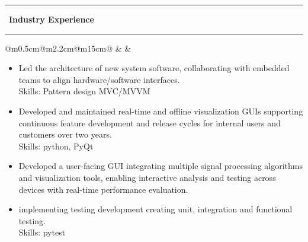 \documentclass[10pt,a4paper]{article}
\newcommand{\sectionline}[1]{%
  \vspace{0.5em}
  \begin{center}
    \textcolor{title_color}{\rule[0.5ex]{0.25\linewidth}{0.5pt}}
    ~{\LARGE \bfseries \textcolor{title_color}{\cambria #1}}~
    \textcolor{title_color}{\rule[0.5ex]{0.25\linewidth}{0.5pt}}
  \end{center}
  \vspace{0.05em}
}
\begin{document}
                      
\newpage
\sectionline{Industry Experience}                    
{\hspace{1.5em}}\begin{tabular}{@{}m{0.5cm}@{\hspace{0.5em}}m{2.2cm}@{\hspace{0.5em}}m{15cm}@{}}
   & 
  \raisebox{1.8em}{\begin{minipage}[t]{\linewidth}
  \centering
    \textcolor{blocktitle1_color}{Sep. 21}\\
    \textcolor{blocktitle1_color}{Present}
  \end{minipage} 
  } &
\end{tabular}                                  

\vspace{-1em}
\begin{itemize}[leftmargin=*]
  \item Led the architecture of new system software, collaborating with embedded teams to align hardware/software interfaces. 
  \\ {\fontsize{10pt}{10pt}\selectfont\textcolor{blocktext2_color}{Skills: Pattern design MVC/MVVM }}    
  \item  Developed and maintained real-time and offline visualization GUIs supporting continuous feature development and release cycles for internal users and customers over two years. 
  \\ {\fontsize{10pt}{10pt}\selectfont\textcolor{blocktext2_color}{Skills: python, PyQt}}     
  \item Developed a user-facing GUI integrating multiple signal processing algorithms and visualization tools, enabling interactive analysis and testing across devices with real-time performance evaluation.
  \item implementing testing development creating unit, integration and functional testing. 
  \\ {\fontsize{10pt}{10pt}\selectfont\textcolor{blocktext2_color}{Skills: pytest}}  
\end{itemize}                
                
\end{document}
